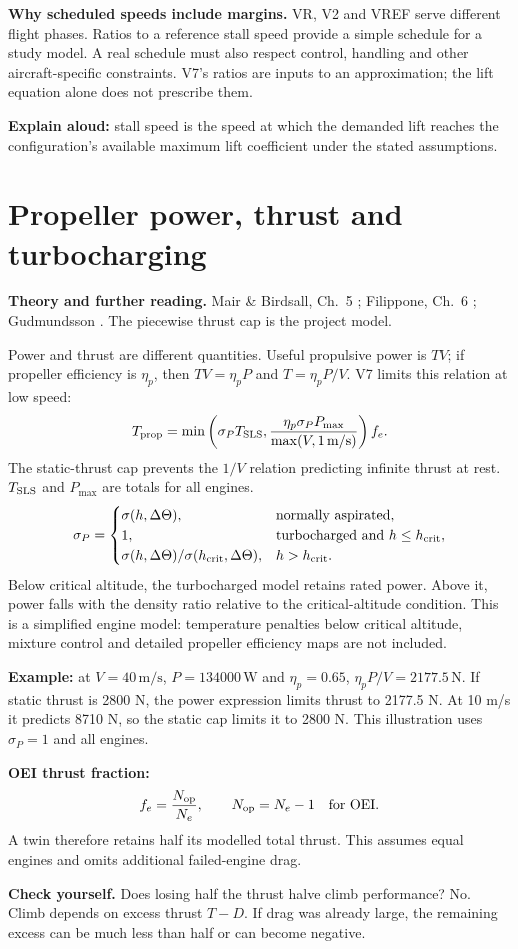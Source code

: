 \documentclass[11pt,letterpaper]{article}
\newcommand{\unit}[1]{\,\mathrm{#1}}
\newcommand{\topic}[1]{\clearpage\section{#1}}
\newcommand{\reading}[1]{{\small\color{navy}\textbf{Theory and further reading.} #1\par}\vspace{3pt}}
\newcommand{\selfcheck}[1]{\par\textbf{Check yourself.} #1\par}
\begin{document}
\textbf{Why scheduled speeds include margins.}
VR, V2 and VREF serve different flight phases. Ratios to a reference stall
speed provide a simple schedule for a study model. A real schedule must also
respect control, handling and other aircraft-specific constraints. V7's ratios
are inputs to an approximation; the lift equation alone does not prescribe them.
\begin{keyidea}
\textbf{Explain aloud:} stall speed is the speed at which the demanded lift
reaches the configuration's available maximum lift coefficient under the
stated assumptions.
\end{keyidea}

\topic{Propeller power, thrust and turbocharging}
\reading{Mair \& Birdsall, Ch.~5 \cite{mair}; Filippone, Ch.~6 \cite{filippone}; Gudmundsson \cite{gudmundsson}. The piecewise thrust cap is the project model.}
Power and thrust are different quantities. Useful propulsive power is $TV$;
if propeller efficiency is $\eta_p$, then $TV=\eta_pP$ and $T=\eta_pP/V$.
V7 limits this relation at low speed:
\[
T_{\rm prop}=\min\left(\sigma_P T_{\rm SLS},
\frac{\eta_p\sigma_PP_{\max}}{\max(V,1\unit{m/s})}\right)f_e.
\]
The static-thrust cap prevents the $1/V$ relation predicting infinite thrust
at rest. $T_{\rm SLS}$ and $P_{\max}$ are totals for all engines.
\[
\sigma_P=\begin{cases}
\sigma(h,\Delta\Theta),&\text{normally aspirated},\\
1,&\text{turbocharged and }h\le h_{\rm crit},\\
\sigma(h,\Delta\Theta)/\sigma(h_{\rm crit},\Delta\Theta),&h>h_{\rm crit}.
\end{cases}
\]
Below critical altitude, the turbocharged model retains rated power. Above it,
power falls with the density ratio relative to the critical-altitude condition.
This is a simplified engine model: temperature penalties below critical altitude,
mixture control and detailed propeller efficiency maps are not included.

\textbf{Example:} at $V=40\unit{m/s}$, $P=134000\unit W$ and $\eta_p=0.65$,
$\eta_pP/V=2177.5\unit N$. If static thrust is 2800 N, the power expression limits
thrust to 2177.5 N. At 10 m/s it predicts 8710 N, so the static cap limits it to
2800 N. This illustration uses $\sigma_P=1$ and all engines.

\textbf{OEI thrust fraction:}
\[
f_e=\frac{N_{\rm op}}{N_e},\qquad N_{\rm op}=N_e-1\quad\text{for OEI}.
\]
A twin therefore retains half its modelled total thrust. This assumes equal
engines and omits additional failed-engine drag.
\selfcheck{Does losing half the thrust halve climb performance? No. Climb depends
on excess thrust $T-D$. If drag was already large, the remaining excess can be
much less than half or can become negative.}
\end{document}
